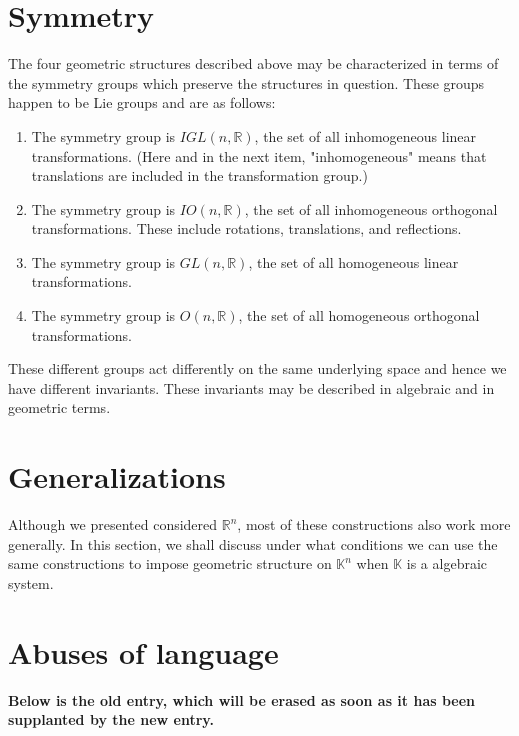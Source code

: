 \documentclass[12pt]{article}
\begin{document}
\section{Symmetry}

The four geometric structures described above may be characterized in
terms of the symmetry groups which preserve the structures in question.
These groups happen to be Lie groups and are as follows:
\begin{enumerate}
\item The symmetry group is $IGL(n,\mathbb{R})$, the set of all
inhomogeneous linear transformations.  (Here and in the next item,
"inhomogeneous" means that translations are included in the
transformation group.)
\item The symmetry group is $IO(n,\mathbb{R})$, the set of all
inhomogeneous orthogonal transformations.  These include rotations,
translations, and reflections.
\item The symmetry group is $GL(n,\mathbb{R})$, the set of all
homogeneous linear transformations.
\item The symmetry group is $O(n,\mathbb{R})$, the set of all
homogeneous orthogonal transformations. 
\end{enumerate}

These different groups act differently on the same underlying space and hence we have different invariants.  These invariants may be described in algebraic and in geometric terms.


\section{Generalizations}

Although we presented considered $\mathbb{R}^n$, most of these constructions also work more generally.  In this section, we shall discuss under what conditions we can use the same constructions to impose geometric structure on $\mathbb{K}^n$ when $\mathbb{K}$ is a algebraic system.

\section{Abuses of language}

{\bf Below is the old entry, which will be erased as soon as it has been supplanted by the new entry.}
\end{document}

